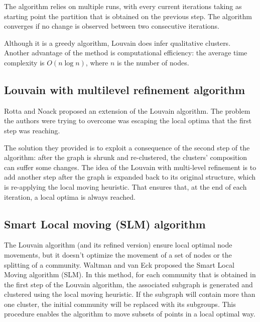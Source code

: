 The algorithm relies on multiple runs, with every current iterations taking as starting point the partition that is obtained on the previous step. The algorithm converges if no change is observed between two consecutive iterations.

Although it is a greedy algorithm, Louvain does infer qualitative clusters. Another advantage of the method is computational efficiency: the average time complexity is $O(n \log n)$, where $n$ is the number of nodes.


\subsection{Louvain with multilevel refinement algorithm}
Rotta and Noack \cite{Rotta2011} proposed an extension of the Louvain algorithm. The problem the authors were trying to overcome was escaping the local optima that the first step was reaching. 

The solution they provided is to exploit a consequence of the second step of the algorithm: after the graph is shrunk and re-clustered, the clusters' composition can suffer some changes. The idea of the Louvain with multi-level refinement is to add another step after the graph is expanded back to its original structure, which is re-applying the local moving heuristic. That ensures that, at the end of each iteration, a local optima is always reached.

\subsection{Smart Local moving (SLM) algorithm}
The Louvain algorithm (and its refined version) ensure local optimal node movements, but it doesn't optimize the movement of a set of nodes or the splitting of a community. Waltman and van Eck \cite{Waltman2013} proposed the Smart Local Moving algorithm (SLM). In this method, for each community that is obtained in the first step of the Louvain algorithm, the associated subgraph is generated and clustered using the local moving heuristic. If the subgraph will contain more than one cluster, the initial community will be replaced with its subgroups. This procedure enables the algorithm to move subsets of points in a local optimal way. 

